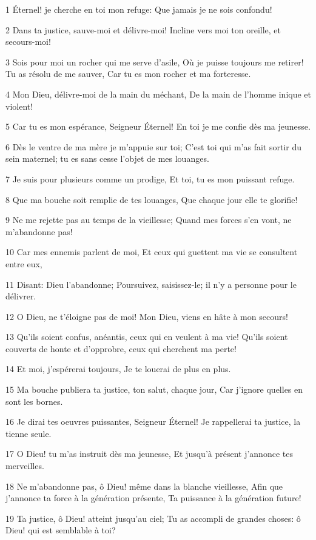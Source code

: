 \par 1 Éternel! je cherche en toi mon refuge: Que jamais je ne sois confondu!
\par 2 Dans ta justice, sauve-moi et délivre-moi! Incline vers moi ton oreille, et secours-moi!
\par 3 Sois pour moi un rocher qui me serve d'asile, Où je puisse toujours me retirer! Tu as résolu de me sauver, Car tu es mon rocher et ma forteresse.
\par 4 Mon Dieu, délivre-moi de la main du méchant, De la main de l'homme inique et violent!
\par 5 Car tu es mon espérance, Seigneur Éternel! En toi je me confie dès ma jeunesse.
\par 6 Dès le ventre de ma mère je m'appuie sur toi; C'est toi qui m'as fait sortir du sein maternel; tu es sans cesse l'objet de mes louanges.
\par 7 Je suis pour plusieurs comme un prodige, Et toi, tu es mon puissant refuge.
\par 8 Que ma bouche soit remplie de tes louanges, Que chaque jour elle te glorifie!
\par 9 Ne me rejette pas au temps de la vieillesse; Quand mes forces s'en vont, ne m'abandonne pas!
\par 10 Car mes ennemis parlent de moi, Et ceux qui guettent ma vie se consultent entre eux,
\par 11 Disant: Dieu l'abandonne; Poursuivez, saisissez-le; il n'y a personne pour le délivrer.
\par 12 O Dieu, ne t'éloigne pas de moi! Mon Dieu, viens en hâte à mon secours!
\par 13 Qu'ils soient confus, anéantis, ceux qui en veulent à ma vie! Qu'ils soient couverts de honte et d'opprobre, ceux qui cherchent ma perte!
\par 14 Et moi, j'espérerai toujours, Je te louerai de plus en plus.
\par 15 Ma bouche publiera ta justice, ton salut, chaque jour, Car j'ignore quelles en sont les bornes.
\par 16 Je dirai tes oeuvres puissantes, Seigneur Éternel! Je rappellerai ta justice, la tienne seule.
\par 17 O Dieu! tu m'as instruit dès ma jeunesse, Et jusqu'à présent j'annonce tes merveilles.
\par 18 Ne m'abandonne pas, ô Dieu! même dans la blanche vieillesse, Afin que j'annonce ta force à la génération présente, Ta puissance à la génération future!
\par 19 Ta justice, ô Dieu! atteint jusqu'au ciel; Tu as accompli de grandes choses: ô Dieu! qui est semblable à toi?
